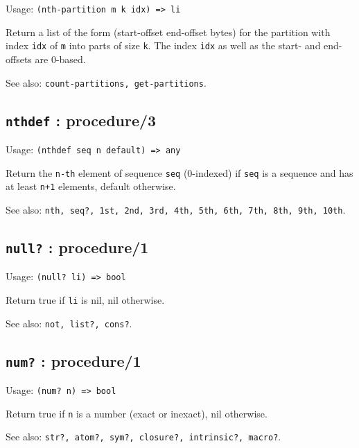 \documentclass[
]{article}
\newcommand{\passthrough}[1]{#1}
\begin{document}
Usage: \passthrough{\lstinline!(nth-partition m k idx) => li!}

Return a list of the form (start-offset end-offset bytes) for the
partition with index \passthrough{\lstinline!idx!} of
\passthrough{\lstinline!m!} into parts of size
\passthrough{\lstinline!k!}. The index \passthrough{\lstinline!idx!} as
well as the start- and end-offsets are 0-based.

See also: \passthrough{\lstinline!count-partitions, get-partitions!}.

\hypertarget{nthdef-procedure3-1}{%
\subsection{\texorpdfstring{\texttt{nthdef} :
procedure/3}{nthdef : procedure/3}}\label{nthdef-procedure3-1}}

Usage: \passthrough{\lstinline!(nthdef seq n default) => any!}

Return the \passthrough{\lstinline!n-th!} element of sequence
\passthrough{\lstinline!seq!} (0-indexed) if
\passthrough{\lstinline!seq!} is a sequence and has at least
\passthrough{\lstinline!n+1!} elements, default otherwise.

See also:
\passthrough{\lstinline!nth, seq?, 1st, 2nd, 3rd, 4th, 5th, 6th, 7th, 8th, 9th, 10th!}.

\hypertarget{null-procedure1-1}{%
\subsection{\texorpdfstring{\texttt{null?} :
procedure/1}{null? : procedure/1}}\label{null-procedure1-1}}

Usage: \passthrough{\lstinline!(null? li) => bool!}

Return true if \passthrough{\lstinline!li!} is nil, nil otherwise.

See also: \passthrough{\lstinline!not, list?, cons?!}.

\hypertarget{num-procedure1-1}{%
\subsection{\texorpdfstring{\texttt{num?} :
procedure/1}{num? : procedure/1}}\label{num-procedure1-1}}

Usage: \passthrough{\lstinline!(num? n) => bool!}

Return true if \passthrough{\lstinline!n!} is a number (exact or
inexact), nil otherwise.

See also:
\passthrough{\lstinline!str?, atom?, sym?, closure?, intrinsic?, macro?!}.
\end{document}
